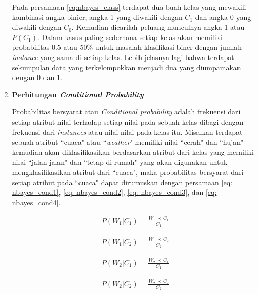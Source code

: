 \begin{enumerate}[label=\textbf{\arabic*).}]
	Pada persamaan \ref{eq:nbayes_class} terdapat dua buah kelas yang mewakili kombinasi angka binier, angka 1 yang diwakili dengan $C_{1}$ dan angka 0 yang diwakili dengan $C_{0}$. Kemudian dicarilah peluang munculnya angka 1 atau $P(C_{1})$. Dalam kasus paling sederhana setiap kelas akan memiliki probabilitas $0.5$ atau $50\%$ untuk masalah klasifikasi biner dengan jumlah \textit{instance} yang sama di setiap kelas. Lebih jelasnya lagi bahwa terdapat sekumpulan data yang terkelompokkan menjadi dua yang diumpamakan dengan 0 dan 1.
	\vspace{1ex}

	\item \textbf{Perhitungan \textit{Conditional Probability}}

	Probabilitas bersyarat atau \textit{Conditional probability} adalah frekuensi dari setiap atribut nilai terhadap setiap nilai pada sebuah kelas dibagi dengan frekuensi dari \textit{instances} atau nilai-nilai pada kelas itu. Misalkan terdapat sebuah atribut ``cuaca" atau ``\textit{weather}" memiliki nilai ``cerah" dan ``hujan" kemudian akan diklasifikasikan berdasarkan atribut dari kelas yang memiliki nilai ``jalan-jalan" dan ``tetap di rumah" yang akan digunakan untuk mengklasifikasikan atribut dari ``cuaca", maka probabilitas bersyarat dari setiap atribut pada ``cuaca" dapat dirumuskan dengan persamaan \ref{eq: nbayes_cond1}, \ref{eq: nbayes_cond2}, \ref{eq: nbayes_cond3}, dan \ref{eq: nbayes_cond4}.

	\begin{equation}\label{eq: nbayes_cond1}
	\begin{split}
	P(W_{1}|C_{1}) = \frac{W_{1}\ \times\ C_{1}}{C_{1}}
	\end{split}
	\end{equation}
	
	\begin{equation}\label{eq: nbayes_cond2}
	\begin{split}
	P(W_{1}|C_{2}) = \frac{W_{1}\ \times\ C_{2}}{C_{2}}
	\end{split}
	\end{equation}
	
	\begin{equation}\label{eq: nbayes_cond3}
	\begin{split}
	P(W_{2}|C_{1}) = \frac{W_{2}\ \times\ C_{1}}{C_{1}}
	\end{split}
	\end{equation}
	
	\begin{equation}\label{eq: nbayes_cond4}
	\begin{split}
	P(W_{2}|C_{2}) = \frac{W_{2}\ \times\ C_{2}}{C_{2}}
	\end{split}
	\end{equation}


\end{enumerate}
